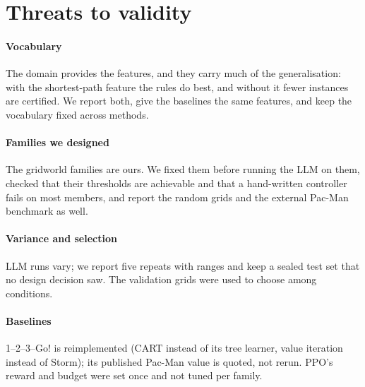 \section{Threats to validity}\label{sec:threats}

\paragraph*{Vocabulary}
The domain provides the features, and they carry much of the generalisation: with the shortest-path feature the
rules do best, and without it fewer instances are certified. We report both, give the baselines the same features,
and keep the vocabulary fixed across methods.

\paragraph*{Families we designed}
The gridworld families are ours. We fixed them before running the LLM on them, checked that their thresholds are
achievable and that a hand-written controller fails on most members, and report the random grids and the external
Pac-Man benchmark as well.

\paragraph*{Variance and selection}
LLM runs vary; we report five repeats with ranges and keep a sealed test set that no design decision saw. The
validation grids were used to choose among conditions.

\paragraph*{Baselines}
1--2--3--Go! is reimplemented (CART instead of its tree learner, value iteration instead of Storm); its published
Pac-Man value is quoted, not rerun. PPO's reward and budget were set once and not tuned per family.
